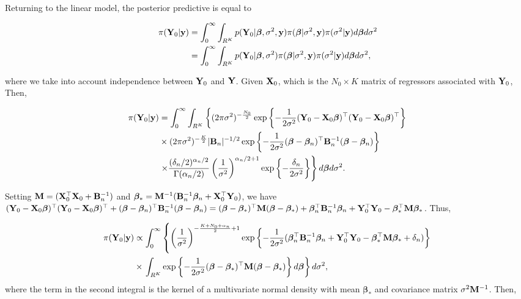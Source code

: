 Returning to the linear model, the posterior predictive is equal to

\begin{align*}
	\pi({\bf{Y}}_0|{\bf{y}})&=\int_{0}^{\infty}\int_{R^K}p({\bf{Y}}_0|\bm{\beta},\sigma^2,{\bf{y}})\pi(\bm{\beta}|\sigma^2,{\bf{y}})\pi(\sigma^2|{\bf{y}})d\bm{\beta} d\sigma^2\\
	&=\int_{0}^{\infty}\int_{R^K}p({\bf{Y}}_0|\bm{\beta},\sigma^2)\pi(\bm{\beta}|\sigma^2,{\bf{y}})\pi(\sigma^2|{\bf{y}})d\bm{\beta} d\sigma^2,
\end{align*}

where we take into account independence between ${\bf{Y}}_0$ and ${\bf{Y}}$. Given ${\bf{X}}_0$, which is the $N_0\times K$ matrix of regressors associated with ${\bf{Y}}_0$, Then,

\begin{align*}
	\pi({\bf{Y}}_0|{\bf{y}})&=\int_{0}^{\infty}\int_{R^K}\left\{ (2\pi\sigma^2)^{-\frac{N_0}{2}} \exp \left\{-\frac{1}{2\sigma^2} ({\bf{Y}}_0 - {\bf{X}}_0\bm{\beta})^{\top}({\bf{Y}}_0 - {\bf{X}}_0\bm{\beta})^{\top} \right\}\right. \\
	& \times (2\pi\sigma^2)^{-\frac{K}{2}} |{\bf{B}}_n|^{-1/2} \exp \left\{-\frac{1}{2\sigma^2} (\bm{\beta} - \bm{\beta}_n)^{\top}{\bf{B}}_n^{-1}(\bm{\beta} - \bm{\beta}_n)\right\} \\
	& \left. \times \frac{(\delta_n/2)^{\alpha_n/2}}{\Gamma(\alpha_n/2)}\left(\frac{1}{\sigma^2}\right)^{\alpha_n/2+1}\exp \left\{-\frac{\delta_n}{2\sigma^2} \right\}\right\}d\bm{\beta} d\sigma^2. \\
\end{align*}

Setting ${\bf{M}}=({\bf{X}}_0^{\top}{\bf{X}}_0+{\bf{B}}_n^{-1})$ and $\bm{\beta}_*={\bf{M}}^{-1}({\bf{B}}_n^{-1}\bm{\beta}_n+{\bf{X}}_0^{\top}{\bf{Y}}_0)$, we have
$({\bf{Y}}_0 - {\bf{X}}_0\bm{\beta})^{\top}({\bf{Y}}_0 - {\bf{X}}_0\bm{\beta})^{\top}+(\bm{\beta} - \bm{\beta}_n)^{\top}{\bf{B}}_n^{-1}(\bm{\beta} - \bm{\beta}_n)=(\bm{\beta} - \bm{\beta}_*)^{\top}{\bf{M}}(\bm{\beta} - \bm{\beta}_*)+\bm{\beta}_n^{\top}{\bf{B}}_n^{-1}\bm{\beta}_n+{\bf{Y}}_0^{\top}{\bf{Y}}_0-\bm{\beta}_*^{\top}{\bf{M}}\bm{\beta}_*$.
Thus, 

{\footnotesize{
\begin{align*}
	\pi({\bf{Y}}_0|{\bf{y}})&\propto\int_{0}^{\infty}\left\{\left(\frac{1}{\sigma^2}\right)^{-\frac{K+N_0+\alpha_n}{2}+1}\exp\left\{-\frac{1}{2\sigma^2}(\bm{\beta}_n^{\top}{\bf{B}}_n^{-1}\bm{\beta}_n+{\bf{Y}}_0^{\top}{\bf{Y}}_0-\bm{\beta}_*^{\top}{\bf{M}}\bm{\beta}_*+\delta_n)\right\}\right.\\
	&\times\left.\int_{R^K}\exp\left\{-\frac{1}{2\sigma^2}(\bm{\beta} - \bm{\beta}_*)^{\top}{\bf{M}}(\bm{\beta} - \bm{\beta}_*)\right\}d\bm{\beta}\right\} d\sigma^2,\\
\end{align*}
}}
where the term in the second integral is the kernel of a multivariate normal density with mean $\bm{\beta}_*$ and covariance matrix $\sigma^2{\bf{M}}^{-1}$. Then,

